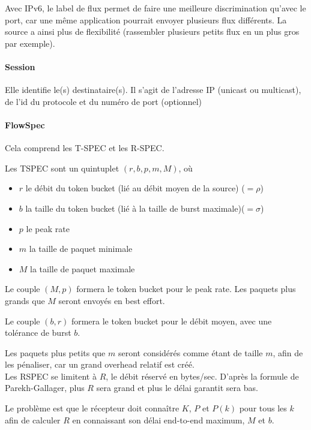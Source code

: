 \documentclass[10pt,a4paper]{report}
\begin{document}
			Avec IPv6, le label de flux permet de faire une meilleure discrimination qu'avec le port, car une même application pourrait envoyer plusieurs flux différents. La source a ainsi plus de flexibilité (rassembler plusieurs petits flux en un plus gros par exemple).
			
			\paragraph{Session}
			
			Elle identifie le(s) destinataire(s). Il s'agit de l'adresse IP (unicast ou multicast), de l'id du protocole et du numéro de port (optionnel)
			
			\paragraph{FlowSpec}
		
			Cela comprend les T-SPEC et les R-SPEC.
			
			Les TSPEC sont un quintuplet $(r, b, p, m, M)$, où
			
			\begin{itemize}
				\item $r$ le débit du token bucket (lié au débit moyen de la source) ($= \rho$)
				\item $b$ la taille du token bucket (lié à la taille de burst maximale)($= \sigma$)
				\item $p$ le peak rate
				\item $m$ la taille de paquet minimale
				\item $M$ la taille de paquet maximale
			\end{itemize}
			
			Le couple $(M, p)$ formera le token bucket pour le peak rate. Les paquets plus grands que $M$ seront envoyés en best effort.
			
			Le couple $(b, r)$ formera le token bucket pour le débit moyen, avec une tolérance de burst $b$.
			
			Les paquets plus petits que $m$ seront considérés comme étant de taille $m$, afin de les pénaliser, car un grand overhead relatif est créé. \\
			
			Les RSPEC se limitent à $R$, le débit réservé en bytes/sec. D'après la formule de Parekh-Gallager, plus $R$ sera grand et plus le délai garantit sera bas.
		
			Le problème est que le récepteur doit connaître $K$, $P$ et $P(k)$ pour tous les $k$ afin de calculer $R$ en connaissant son délai end-to-end maximum, $M$ et $b$.
			
\end{document}
